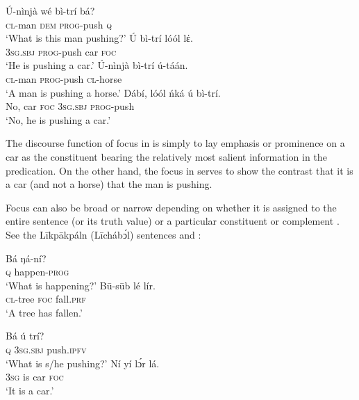 \documentclass[output=paper,colorlinks,citecolor=brown]{langscibook}
\begin{document}
\ea%
    \label{ex:bisilki:4}
    \ea\label{ex:bisilki:4a}
    \gll    Ú-nìnjà	wé	bì-trí		bá?\\
            \textsc{cl-}man	\textsc{dem}	\textsc{prog-}push	\textsc{q}\\
    \glt    ‘What is this man pushing?’
    \ex\label{ex:bisilki:4b}
    \gll    Ú		bì-trí		lóól	lέ.\\
            \textsc{3sg.sbj}	\textsc{prog-}push	car	\textsc{foc}\\
    \glt    ‘He is pushing a car.’
    \z
\ex%
    \label{ex:bisilki:5}
    \ea\label{ex:bisilki:5a}
    \gll    Ú-nìnjà	bì-trí		ú-táán.\\
            \textsc{cl-}man	\textsc{prog-}push	\textsc{cl-}horse\\
    \glt    ‘A man is pushing a horse.’
    \ex\label{ex:bisilki:5b}
    \gll    Dábí,	lóól	ńká	ú		bì-trí.\\
            No,	car	\textsc{foc}	\textsc{3sg.sbj}	\textsc{prog-}push\\
    \glt    ‘No, he is pushing a car.’
    \z
\z

The discourse function of focus in  is simply to lay emphasis or prominence on a car as the constituent bearing the relatively most salient information in the predication. On the other hand, the focus in  serves to show the contrast that it is a car (and not a horse) that the man is pushing.

Focus can also be broad or narrow depending on whether it is assigned to the entire sentence (or its truth value) or a particular constituent or complement \citep[44]{Dik1981}. See the Līkpākpáln (Līchábͻ́l) sentences  and :

\ea%
    \label{ex:bisilki:6}
    \ea\label{ex:bisilki:6a}
    \gll    Bá	ŋá-ní?\\
            \textsc{q}	happen\textsc{-prog}\\
    \glt    ‘What is happening?’
    \ex\label{ex:bisilki:6b}
    \gll    Bū-sūb	lé	lír.\\
            \textsc{cl-}tree		\textsc{foc}	fall\textsc{.prf}\\
    \glt    ‘A tree has fallen.’
    \z
\z

\ea%
    \label{ex:bisilki:7}
    \ea\label{ex:bisilki:7a}
    \gll    Bá	ú		trí?\\
            \textsc{q}	\textsc{3sg.sbj}	push\textsc{.ipfv}\\
    \glt    ‘What is s/he pushing?’
    \ex\label{ex:bisilki:7b}
    \gll    Ní	yí	lɔ́r	lá.\\
            \textsc{3sg}	is	car	\textsc{foc}\\
    \glt    ‘It is a car.’
    \z
\z
\end{document}
